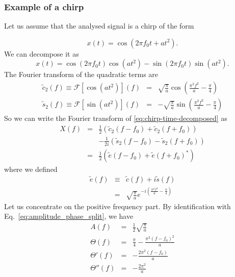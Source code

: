 \documentclass{article}
\begin{document}
\subsubsection{Example of a chirp}
Let us assume that the analysed signal is a chirp of the form 

\begin{equation}
\label{eq:chirp-time}
    x(t) = \cos\left( 2 \pi f_0 t + a t^{2} \right).
\end{equation}
We can decompose it as 
\begin{equation}
\label{eq:chirp-time-decomposed}
    x(t) = \cos\left( 2 \pi f_0 t \right) \cos\left(a t^{2} \right) - \sin\left( 2 \pi f_0 t \right) \sin\left(a t^{2} \right).
\end{equation}
The Fourier transform of the quadratic terms are 
\begin{eqnarray}
   \tilde{c}_{2}(f) \equiv \mathcal{F}\left[\cos\left(a t^{2} \right)\right](f) & =&  \sqrt{\frac{\pi}{a}} \cos\left(\frac{\pi^2 f^2}{a} - \frac{\pi}{4} \right) \nonumber \\
   \tilde{s}_{2}(f) \equiv \mathcal{F}\left[\sin\left(a t^{2} \right)\right](f) & =&  - \sqrt{\frac{\pi}{a}} \sin\left(\frac{\pi^2 f^2}{a} - \frac{\pi}{4} \right) 
\end{eqnarray}
So we can write the Fourier transform of \eqref{eq:chirp-time-decomposed} as
\begin{eqnarray}
    X(f) & = & \frac{1}{2}\left(\tilde{c}_{2}(f-f_0) + \tilde{c}_{2}(f+f_0)\right) \nonumber \\
    & &  - \frac{1}{2i}\left(\tilde{s}_{2}(f-f_0) - \tilde{s}_{2}(f+f_0)\right) \nonumber \\
    & = & \frac{1}{2}\left(\tilde{e}(f-f_0) + \tilde{e}(f+f_0)^{\ast}\right)
\end{eqnarray}
where we defined
\begin{eqnarray}
    \tilde{e}(f) & \equiv & \tilde{c}(f) + i \tilde{s}(f) \nonumber \\
    & = & \sqrt{\frac{\pi}{a}} e^{-i \left(\frac{\pi^2 f^2}{a} - \frac{\pi}{4} \right)}
\end{eqnarray}
Let us concentrate on the positive frequency part. By identification with Eq.~\eqref{eq:amplitude_phase_split}, we have
\begin{eqnarray}
    A(f) & = & \frac{1}{2}\sqrt{\frac{\pi}{a}} \nonumber \\
    \Theta(f) & = & \frac{\pi}{4} - \frac{\pi^2 (f-f_0)^2}{a} \nonumber \\
    \Theta'(f) & = & - \frac{2 \pi^2 (f-f_0)}{a} \nonumber \\
    \Theta''(f) & = & - \frac{2 \pi^2}{a}
\end{eqnarray}
\end{document}
